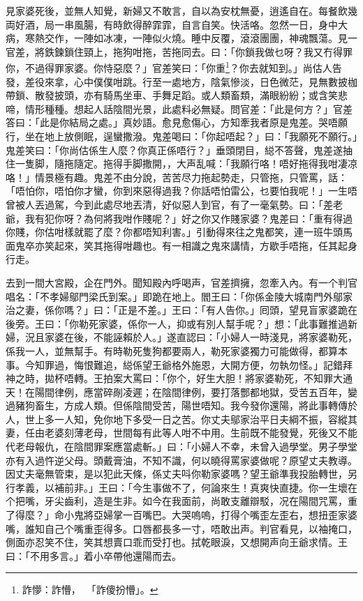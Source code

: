 \documentclass[a5paper, 12pt, openany]{book} %
\begin{document}
	見家婆死後，並無人知覺，新婦又不敢言，自以為安枕無憂，逍遙自在。每餐飲幾両好酒，局一串風腸，有時飲得醉霏霏，自言自笑。快活咯。忽然一日，身中大病，寒熱交作，一陣如冰凍，一陣似火燒。睡中反覆，滾滾團團，神魂飄蕩。見一官差，將鉄鍊鎖住頸上，拖狗咁拖，苦拖同去。曰：「你鎖我做乜呀？我又冇得罪你，不過得罪家婆。你恃惡麼？」官差笑曰：「你重\footnote{詐懜：詐懵，「詐傻扮懵」。}？你去就知到。」尚估人告發，差役來拿，心中僕僕咁跳。行至一處地方，陰氣慘淡，日色微茫，見無數披枷帶鎖、散發披頭，亦有騎馬坐車、手舞足蹈。或人類畜類，滿眼紛紛；或含笑悲啼，情形種種。想起人話陰間光景，此處料必無疑。問官差：「此是何方？」官差答曰：「此是你結局之處。」真妙語。愈見愈傷心，方知牽我者原是鬼差。哭唔願行，坐在地上放側眠，逞蠻撒潑。鬼差喝曰：「你起唔起？」曰：「我願死不願行。」鬼差笑曰：「你尚估係生人麼？你真正係唔行？」垂頭閉目，縂不答聲，鬼差遂抽住一隻脚，隨拖隨定。拖得手脚撒開，，大声乱喊：「我願行咯！唔好拖得我咁凄凉咯！」情景極有趣。鬼差不由分說，苦苦尽力拖起勢走，只管拖，只管罵，話：「唔怕你，唔怕你才蠻，你到來惡得過我？你話唔怕雷公，乜要怕我呢！」一生唔曾被人丟過駕，今到此處尽地丟清，好似惡人到官，有了一毫氣勢。曰：「差老爺，我有犯你呀？為何將我咁作賤呢？」好之你又作賤家婆？鬼差曰：「重有得過你賤，你估咁樣就罷了麼？你都唔知利害。」引動得來往之鬼都笑，連一班牛頭馬面鬼卒亦笑起來，笑其拖得咁趣也。有一相識之鬼來講情，方歇手唔拖，任其起身行走。

	去到一間大宮殿，企在門外。聞知殿內呼喝声，官差擠擁，忽牽入內。有一个判官唱名：「不孝婦鄔門梁氏到案。」即跪在地上。閻王曰：「你係金陵大城南門外鄔家治之妻，係你嗎？」曰：「正是不差。」王曰：「有人告你。」囘頭，望見盲家婆跪在後旁。王曰：「你勒死家婆，係你一人，抑或有別人幫手呢？」想：「此事難推過新婦，況且家婆在後，不能誣賴於人。」遂直認曰：「小婦人一時淺見，將家婆勒死，係我一人，並無幫手。有時勒死隻狗都要兩人，勒死家婆獨力可能做得，都算本事。今知罪過，悔恨難追，縂係望王爺格外施恩，大開方便，勿執勿怪。」記錯拜神之時，拋杯唔轉。王拍案大罵曰：「你个，好生大胆！將家婆勒死，不知罪大通天！在陽間律例，應當碎剮凌遲；在陰間律例，要打落酆都地獄，受苦五百年，變過豬狗畜生，方成人類。但係陰間受苦，陽世唔知。我今發你還陽，將此事轉傳於人，世上多一人知，免你地下多受一日之苦。你丈夫鄔家治平日夫綱不振，容縱其妻，任由老婆刻薄老母，世間每有此等人咁不中用。生前既不能發覺，死後又不能代老母報仇，在陰間罪案應當處斬。」曰：「小婦人不幸，未曾入過學堂。男子學堂亦有入過忤逆父母。頭戴膏油，不知不識，何以曉得罵家婆做呢？原望丈夫教導。因丈夫毫無管束，是以犯此天條，係丈夫呌你勒家婆嗎？望王爺準我投胎轉世，另行孝義，以補前非。」王曰：「今生事做不了，何論來生！真爽快直捷。你一生壞在个把嘴，牙尖齒利，造是生非。如今在我面前，尚敢支離辯駁，况在陽間咒罵，重了得麼？」命小鬼將亞婦掌一百嘴巴。大哭嗚嗚，打得个嘴歪左歪右，想扭歪家婆嘴，誰知自己个嘴重歪得多。口唇都長多一寸，唔敢出声。判官看見，以袖掩口，側面亦忍笑不住，笑其想賣口乖而受打也。拭乾眼淚，又想開声向王爺求情。王曰：「不用多言。」着小卒帶他還陽而去。
\end{document}
